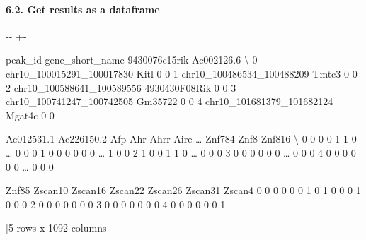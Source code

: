 \documentclass[letterpaper,10pt,english]{sphinxmanual}
\newlength\nbsphinxcodecellspacing
\begin{document}
\paragraph{6.2. Get results as a dataframe}
\label{\detokenize{notebooks/02_motif_scan/02_atac_peaks_to_TFinfo_with_celloracle_190901:6.2.-Get-results-as-a-dataframe}}
{
\begin{sphinxVerbatim}[commandchars=\\\{\}]
\llap{\color{nbsphinxin}[20]:\,\hspace{\fboxrule}\hspace{\fboxsep}}  
\end{sphinxVerbatim}
}

{

\kern-\sphinxverbatimsmallskipamount\kern-\baselineskip
\kern+\FrameHeightAdjust\kern-\fboxrule
\vspace{\nbsphinxcodecellspacing}

\begin{sphinxVerbatim}[commandchars=\\\{\}]
\llap{\color{nbsphinxout}[20]:\,\hspace{\fboxrule}\hspace{\fboxsep}}                     peak\_id gene\_short\_name  9430076c15rik  Ac002126.6  \textbackslash{}
0  chr10\_100015291\_100017830            Kitl              0           0
1  chr10\_100486534\_100488209           Tmtc3              0           0
2  chr10\_100588641\_100589556   4930430F08Rik              0           0
3  chr10\_100741247\_100742505         Gm35722              0           0
4  chr10\_101681379\_101682124          Mgat4c              0           0

   Ac012531.1  Ac226150.2  Afp  Ahr  Ahrr  Aire  {\ldots}  Znf784  Znf8  Znf816  \textbackslash{}
0           0           0    0    1     1     0  {\ldots}       0     0       0
1           0           0    0    0     0     0  {\ldots}       1     0       0
2           1           0    0    1     1     0  {\ldots}       0     0       0
3           0           0    0    0     0     0  {\ldots}       0     0       0
4           0           0    0    0     0     0  {\ldots}       0     0       0

   Znf85  Zscan10  Zscan16  Zscan22  Zscan26  Zscan31  Zscan4
0      0        0        0        0        0        1       0
1      0        0        0        1        0        0       0
2      0        0        0        0        0        0       0
3      0        0        0        0        0        0       0
4      0        0        0        0        0        0       1

[5 rows x 1092 columns]
\end{sphinxVerbatim}
}
\end{document}
